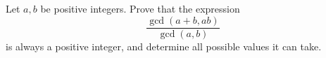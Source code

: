 Let $a,b$ be positive integers.
Prove that the expression
$$\frac{\gcd(a+b,ab)}{\gcd(a,b)}$$
is always a positive integer, and determine all possible values it can take.
